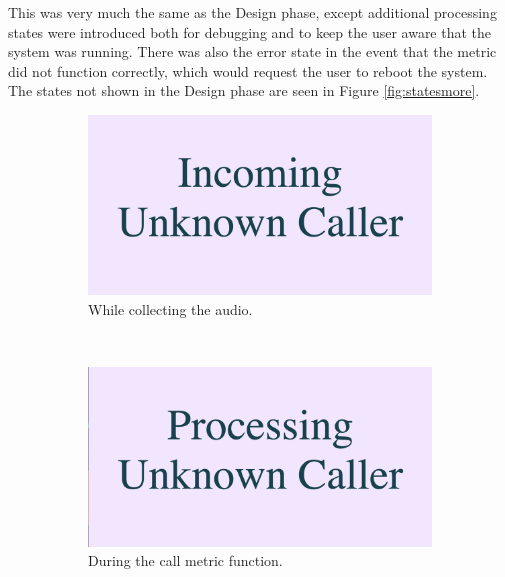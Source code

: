 \documentclass[main.tex]{subfiles}
\begin{document}
This was very much the same as the Design phase, except additional processing states were introduced both for debugging and to keep the user aware that the system was running. There was also the error state in the event that the metric did not function correctly, which would request the user to reboot the system. The states not shown in the Design phase are seen in Figure \ref{fig:statesmore}.

\begin{figure}[H]
	\captionsetup[subfigure]{position=b}
        \centering
        \begin{subfigure}{0.45\textwidth}
                \includegraphics[width=\textwidth]{pics/state3}
                \caption{While collecting the audio.}
                \label{fig:state3}
        \end{subfigure}
        ~
        \begin{subfigure}{0.45\textwidth}
                \includegraphics[width=\textwidth]{pics/state5}
                \caption{During the call metric function.}
                \label{fig:state5}
        \end{subfigure}
		\\
		\begin{subfigure}{0.45\textwidth}

\end{subfigure}
\end{figure}
\end{document}

